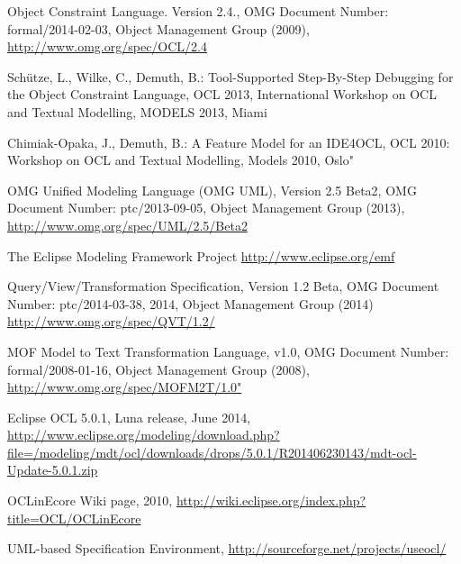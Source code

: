 \documentclass[a4paper]{article}
\begin{document}
\begin{thebibliography}{11}

 Object Constraint Language. Version 2.4., OMG Document Number: formal/2014-02-03, Object Management Group (2009),  \url{http://www.omg.org/spec/OCL/2.4}

 Sch\"utze, L., Wilke, C., Demuth, B.: Tool-Supported Step-By-Step Debugging
for the Object Constraint Language, OCL 2013, International Workshop on OCL and Textual Modelling, MODELS 2013, Miami

 Chimiak-Opaka, J., Demuth, B.: A Feature Model for an IDE4OCL, OCL 2010: Workshop on OCL and Textual Modelling, Models 2010, Oslo"

 OMG Unified Modeling Language (OMG UML), Version 2.5 Beta2, {OMG Document Number}: ptc/2013-09-05, Object Management Group (2013), \url{http://www.omg.org/spec/UML/2.5/Beta2}

 The Eclipse Modeling Framework Project \url{http://www.eclipse.org/emf}

 Query/View/Transformation Specification, Version 1.2 Beta, {OMG Document Number}: ptc/2014-03-38, 2014, Object Management Group (2014) \url{http://www.omg.org/spec/QVT/1.2/}

 MOF Model to Text Transformation Language,  v1.0, {OMG Document Number}: formal/2008-01-16, Object Management Group (2008), \url{http://www.omg.org/spec/MOFM2T/1.0"}

 Eclipse OCL 5.0.1, Luna release, June 2014, \url{http://www.eclipse.org/modeling/download.php?file=/modeling/mdt/ocl/downloads/drops/5.0.1/R201406230143/mdt-ocl-Update-5.0.1.zip}

 OCLinEcore Wiki page, 2010, \url{http://wiki.eclipse.org/index.php?title=OCL/OCLinEcore}

 UML-based Specification Environment, \url{http://sourceforge.net/projects/useocl/}

\end{thebibliography}
\end{document}
